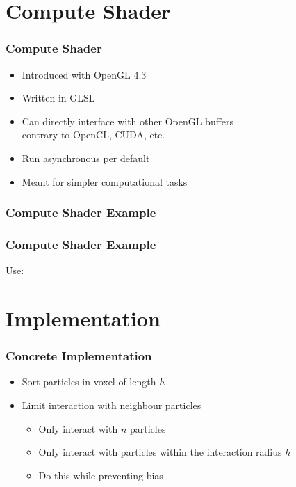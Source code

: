 \documentclass{beamer}
\begin{document}
\section{Compute Shader}

\begin{frame}
    \frametitle{Compute Shader}
    \begin{itemize}
        \item Introduced with OpenGL 4.3
        \item Written in GLSL
        \item Can directly interface with other OpenGL buffers\\
            contrary to OpenCL, CUDA, etc.
        \item Run asynchronous per default
        \item Meant for simpler computational tasks
    \end{itemize}
\end{frame}

\begin{frame}
    \frametitle{Compute Shader Example}
    
\end{frame}

\begin{frame}
    \frametitle{Compute Shader Example}
    Use:
    
\end{frame}

\section{Implementation}
\begin{frame}
    \frametitle{Concrete Implementation}
    \begin{itemize}
        \item Sort particles in voxel of length $h$
        \item Limit interaction with neighbour particles 
            \begin{itemize}
                \item Only interact with $n$ particles
                \item Only interact with particles within the interaction radius $h$
                \item Do this while preventing bias
            \end{itemize}
    \end{itemize}
\end{frame}
\end{document}
